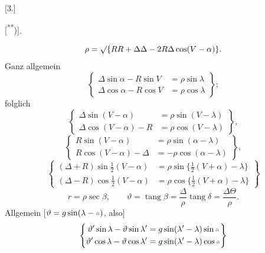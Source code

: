\clearpage\begingroup{}
\makeatletter\tagsleft@true\let\veqno\@@leqno\makeatother
\noindent{\small [S. 3]}
\begin{center}
[3.]\par\medskip
{}\textup{[\textsuperscript{**})]}.
\end{center}
\begingroup\renewcommand{\thefootnote}{}\endgroup
\[
\rho=\surd\{RR+\Delta\Delta-2R\Delta\cos(V-\alpha)\}.
\]
\noindent Ganz allgemein
\[
\left\{\begin{aligned}
\Delta\sin\alpha-R\sin V&=\rho\sin\lambda\\
\Delta\cos\alpha-R\cos V&=\rho\cos\lambda
\end{aligned}\right\};
\]
\noindent folglich
\begin{equation}
\left\{\begin{aligned}
\Delta\sin(V-\alpha)&=\rho\sin(V-\lambda)\\
\Delta\cos(V-\alpha)-R&=\rho\cos(V-\lambda)
\end{aligned}\right\},\tag*{I.}
\end{equation}
\begin{equation}
\left\{\begin{aligned}
R\sin(V-\alpha)&=\rho\sin(\alpha-\lambda)\\
R\cos(V-\alpha)-\Delta&=-\rho\cos(\alpha-\lambda)
\end{aligned}\right\},\tag*{II.}
\end{equation}
\begin{equation}
\left\{\begin{aligned}
(\Delta+R)\sin\tfrac12(V-\alpha)&=\rho\sin\{\tfrac12(V+\alpha)-\lambda\}\\
(\Delta-R)\cos\tfrac12(V-\alpha)&=\rho\cos\{\tfrac12(V+\alpha)-\lambda\}
\end{aligned}\right\}\tag*{III.}
\end{equation}
\clearpage
{}
\[
r=\rho\sec\beta,\qquad
\vartheta=\operatorname{tang}\beta=\frac{\Delta}{\rho}\operatorname{tang}\delta=\frac{\Delta\Theta}{\rho}.
\]
\noindent Allgemein [$\vartheta=g\sin(\lambda-\AstNode)$, also]
\[
\left\{\begin{aligned}
\vartheta'\sin\lambda-\vartheta\sin\lambda'&=g\sin(\lambda'-\lambda)\sin\AstNode\\
\vartheta'\cos\lambda-\vartheta\cos\lambda'&=g\sin(\lambda'-\lambda)\cos\AstNode
\end{aligned}\right\}
\]
